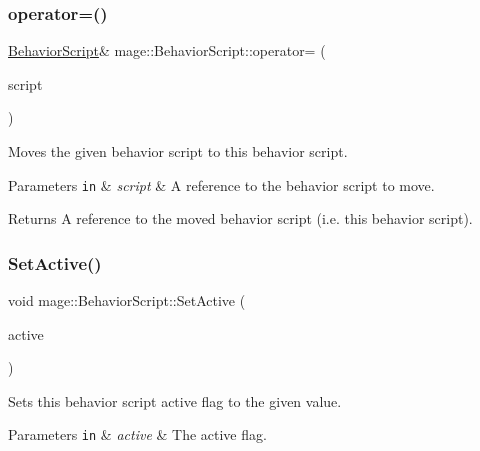\subsubsection{\texorpdfstring{operator=()}{operator=()}\hspace{0.1cm}{\footnotesize\ttfamily [2/2]}}
{\footnotesize\ttfamily \hyperlink{classmage_1_1_behavior_script}{Behavior\+Script}\& mage\+::\+Behavior\+Script\+::operator= (\begin{DoxyParamCaption}\item[{\hyperlink{classmage_1_1_behavior_script}{Behavior\+Script} \&\&}]{script }\end{DoxyParamCaption})\hspace{0.3cm}{\ttfamily [delete]}}

Moves the given behavior script to this behavior script.


\begin{DoxyParams}[1]{Parameters}
\mbox{\tt in}  & {\em script} & A reference to the behavior script to move. \\
\hline
\end{DoxyParams}
\begin{DoxyReturn}{Returns}
A reference to the moved behavior script (i.\+e. this behavior script). 
\end{DoxyReturn}
\hypertarget{classmage_1_1_behavior_script_ab0dc76b101fd514c6e9f8799de382e8a}{}\label{classmage_1_1_behavior_script_ab0dc76b101fd514c6e9f8799de382e8a} 
\subsubsection{\texorpdfstring{Set\+Active()}{SetActive()}}
{\footnotesize\ttfamily void mage\+::\+Behavior\+Script\+::\+Set\+Active (\begin{DoxyParamCaption}\item[{bool}]{active }\end{DoxyParamCaption})\hspace{0.3cm}{\ttfamily [noexcept]}}

Sets this behavior script active flag to the given value.


\begin{DoxyParams}[1]{Parameters}
\mbox{\tt in}  & {\em active} & The active flag. \\
\hline
\end{DoxyParams}
\hypertarget{classmage_1_1_behavior_script_a2beae460bb84a135aa7e29c7baf6b25b}{}\label{classmage_1_1_behavior_script_a2beae460bb84a135aa7e29c7baf6b25b} 
